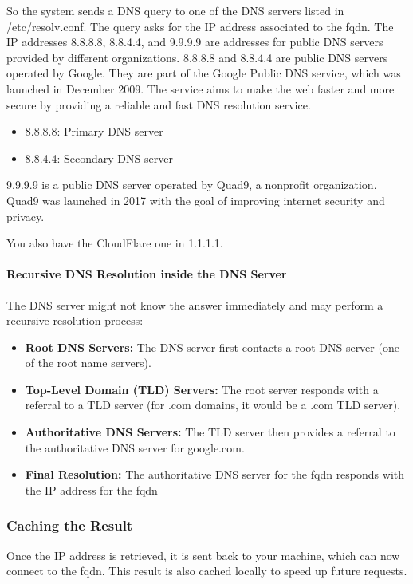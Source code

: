 \documentclass{article}
\newenvironment{blocktemplateII}[1]{%
    \tcolorbox[beamer,%
    noparskip,breakable,
    colframe=Green,%
    colbacklower=LimeGreen!75!LightGreen,%
    title=#1]}%
    {\endtcolorbox}
\begin{document}
So the system sends a DNS query to one of the DNS servers listed in /etc/resolv.conf. The query asks for the IP address associated to the fqdn.
\begin{blocktemplateII}{Note}
The IP addresses 8.8.8.8, 8.8.4.4, and 9.9.9.9 are addresses for public DNS servers provided by different organizations. 8.8.8.8 and 8.8.4.4 are public DNS servers operated by Google. They are part of the Google Public DNS service, which was launched in December 2009. The service aims to make the web faster and more secure by providing a reliable and fast DNS resolution service.
\begin{itemize}
    \item 8.8.8.8: Primary DNS server
    \item 8.8.4.4: Secondary DNS server
\end{itemize}

9.9.9.9  is a public DNS server operated by Quad9, a nonprofit organization. Quad9 was launched in 2017 with the goal of improving internet security and privacy.

You also have the CloudFlare one in 1.1.1.1.
\end{blocktemplateII}

\paragraph{Recursive DNS Resolution inside the DNS Server}
The DNS server might not know the answer immediately and may perform a recursive resolution process:

\begin{itemize}
    \item \textbf{Root DNS Servers:} The DNS server first contacts a root DNS server (one of the root name servers).
    \item \textbf{Top-Level Domain (TLD) Servers:} The root server responds with a referral to a TLD server (for .com domains, it would be a .com TLD server).
    \item \textbf{Authoritative DNS Servers:} The TLD server then provides a referral to the authoritative DNS server for google.com.
    \item \textbf{Final Resolution:} The authoritative DNS server for the fqdn responds with the IP address for the fqdn    
\end{itemize}

\subsubsection{Caching the Result}
Once the IP address is retrieved, it is sent back to your machine, which can now connect to the fqdn. This result is also cached locally to speed up future requests.
\end{document}
